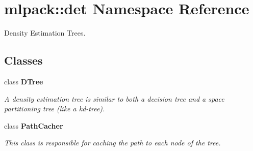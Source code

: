\section{mlpack\+:\+:det Namespace Reference}
\label{namespacemlpack_1_1det}


Density Estimation Trees.  


\subsection*{Classes}
\begin{DoxyCompactItemize}
\item 
class \textbf{ D\+Tree}
\begin{DoxyCompactList}\small\item\em A density estimation tree is similar to both a decision tree and a space partitioning tree (like a kd-\/tree). \end{DoxyCompactList}\item 
class \textbf{ Path\+Cacher}
\begin{DoxyCompactList}\small\item\em This class is responsible for caching the path to each node of the tree. \end{DoxyCompactList}\end{DoxyCompactItemize}
